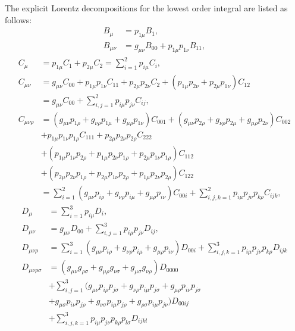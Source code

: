 The explicit Lorentz decompositions for the lowest order integral are listed as follows:
\begin{align}
B_\mu &= p_{1\mu}B_1,\nonumber\\
B_{\mu\nu}&=g_{\mu\nu}B_{00}+p_{1\mu}p_{1\nu}B_{11},
\end{align}
\begin{align}
C_\mu &= p_{1\mu}C_1+p_{2\mu}C_2=\sum_{i=1}^{2}p_{i\mu}C_i,\nonumber\\
C_{\mu\nu}&=g_{\mu\nu}C_{00}+p_{1\mu}p_{1\nu}C_{11}+p_{2\mu}p_{2\nu}C_{2}+(p_{1\mu}p_{2\nu}+p_{2\mu}p_{1\nu})C_{12}\nonumber\\
&=g_{\mu\nu}C_{00}+\sum_{i,j=1}^2 p_{i\mu}p_{j\nu}C_{ij},\nonumber\\
C_{\mu\nu\rho}&=(g_{\mu\nu}p_{1\rho}+g_{\nu\rho}p_{1\mu}+g_{\mu\rho}p_{1\nu})C_{001}+(g_{\mu\nu}p_{2\rho}+g_{\nu\rho}p_{2\mu}+g_{\mu\rho}p_{2\nu})C_{002}\nonumber\\
&+p_{1\mu}p_{1\nu}p_{1\rho}C_{111}+p_{2\mu}p_{2\nu}p_{2\rho}C_{222}\nonumber\\
&+(p_{1\mu}p_{1\nu}p_{2\rho}+p_{1\mu}p_{2\nu}p_{1\rho}+p_{2\mu}p_{1\nu}p_{1\rho})C_{112}\nonumber\\
&+(p_{2\mu}p_{2\nu}p_{1\rho}+p_{2\mu}p_{1\nu}p_{2\rho}+p_{1\mu}p_{2\nu}p_{2\rho})C_{122}\nonumber\\
&=\sum_{i=1}^2(g_{\mu\nu}p_{i\rho}+g_{\nu\rho}p_{i\mu}+g_{\mu\rho}p_{i\nu})C_{00i}+\sum_{i,j,k=1}^2 p_{i\mu}p_{j\nu}p_{k\rho}C_{ijk},
\end{align}
\begin{align}
D_\mu&=\sum_{i=1}^{3}p_{i\mu}D_i,\nonumber\\
D_{\mu\nu}&=g_{\mu\nu}D_{00}+\sum_{i,j=1}^3 p_{i\mu}p_{j\nu}D_{ij},\nonumber\\
D_{\mu\nu\rho}&=\sum_{i=1}^3(g_{\mu\nu}p_{i\rho}+g_{\nu\rho}p_{i\mu}+g_{\mu\rho}p_{i\nu})D_{00i}+\sum_{i,j,k=1}^3p_{i\mu}p_{j\nu}p_{k\rho}D_{ijk}\nonumber\\
D_{\mu\nu\rho\sigma}&=(g_{\mu\nu}g_{\rho\sigma}+g_{\mu\rho}g_{\nu\sigma}+g_{\mu\sigma}g_{\nu\rho})D_{0000}\nonumber\\
&+\sum_{i,j=1}^3( g_{\mu\nu}p_{i\rho}p_{j\sigma}+g_{\nu\rho}p_{i\mu}p_{j\sigma}+g_{\mu\rho}p_{i\nu}p_{j\sigma}\nonumber\\
&+g_{\mu\sigma}p_{i\nu}p_{j\rho}+g_{\nu\sigma}p_{i\mu}p_{j\rho}+g_{\rho\sigma}p_{i\mu}p_{j\nu} )D_{00ij}\nonumber\\
&+\sum_{i,j,k=1}^3 p_{i\mu}p_{j\nu}p_{k\rho}p_{l\sigma}D_{ijkl}
\end{align}

